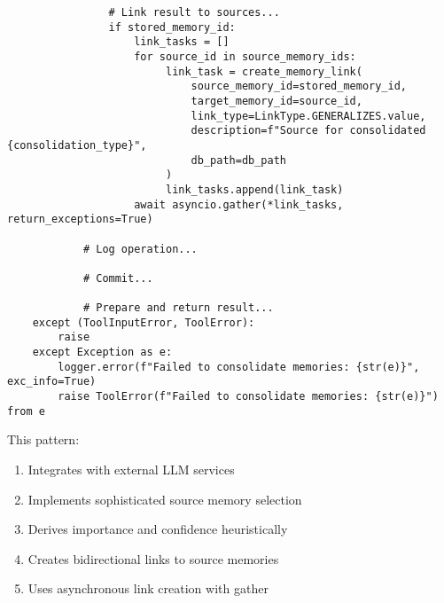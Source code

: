\documentclass[12pt,a4paper]{article}
\begin{document}
\begin{pageablecode}
\begin{verbatim}
                # Link result to sources...
                if stored_memory_id:
                    link_tasks = []
                    for source_id in source_memory_ids:
                         link_task = create_memory_link(
                             source_memory_id=stored_memory_id,
                             target_memory_id=source_id,
                             link_type=LinkType.GENERALIZES.value,
                             description=f"Source for consolidated {consolidation_type}",
                             db_path=db_path
                         )
                         link_tasks.append(link_task)
                    await asyncio.gather(*link_tasks, return_exceptions=True)

            # Log operation...

            # Commit...

            # Prepare and return result...
    except (ToolInputError, ToolError):
        raise
    except Exception as e:
        logger.error(f"Failed to consolidate memories: {str(e)}", exc_info=True)
        raise ToolError(f"Failed to consolidate memories: {str(e)}") from e
\end{verbatim}
\end{pageablecode}
This pattern:
\begin{enumerate}[label=\arabic*.]
    \item Integrates with external LLM services
    \item Implements sophisticated source memory selection
    \item Derives importance and confidence heuristically
    \item Creates bidirectional links to source memories
    \item Uses asynchronous link creation with gather
\end{enumerate}
\end{document}
